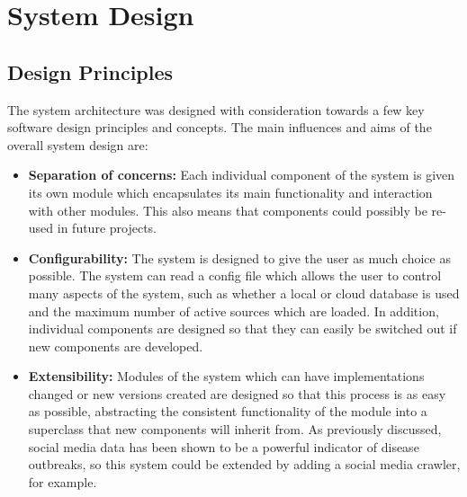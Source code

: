 \documentclass{l4proj}
\begin{document}


\chapter{System Design}
\section{Design Principles}
The system architecture was designed with consideration towards a few key software design principles and concepts. The main influences and aims of the overall system design are:
\begin{itemize}
    \item \textbf{Separation of concerns: } Each individual component of the system is given its own module which encapsulates its main functionality and interaction with other modules. This also means that components could possibly be re-used in future projects.
    \item \textbf{Configurability: } The system is designed to give the user as much choice as possible. The system can read a config file which allows the user to control many aspects of the system, such as whether a local or cloud database is used and the maximum number of active sources which are loaded. In addition, individual components are designed so that they can easily be switched out if new components are developed.
    \item \textbf{Extensibility: } Modules of the system which can have implementations changed or new versions created are designed so that this process is as easy as possible, abstracting the consistent functionality of the module into a superclass that new components will inherit from. As previously discussed, social media data has been shown to be a powerful indicator of disease outbreaks, so this system could be extended by adding a social media crawler, for example.
\end{itemize}
\end{document}
